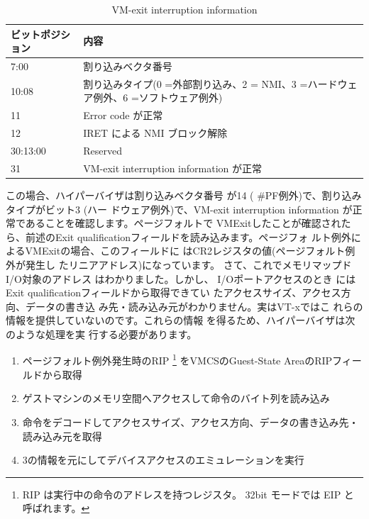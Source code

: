 \begin{table}\centering
\begin{tabular}{|p{4.5cm}|p{10cm}|} \hline

ビットポジション & 内容 \\
\hline
7:00 & 割り込みベクタ番号 \\
\hline
10:08 & 割り込みタイプ(0 =外部割り込み、2 = NMI、3 =ハードウェア例外、6 =ソフトウェア例外) \\
\hline
11 & Error code が正常 \\
\hline
12 & IRET による NMI ブロック解除 \\
\hline
30:13:00 & Reserved \\
\hline
31 & VM-exit interruption information が正常 \\
\hline



\end{tabular}
\caption{VM-exit interruption information}
\label{tab2}
\end{table}

 この場合、ハイパーバイザは割り込みベクタ番号
が14 ( \#PF例外)で、割り込みタイプがビット3 (ハー
ドウェア例外)で、VM-exit interruption information
が正常であることを確認します。ページフォルトで
VMExitしたことが確認されたら、前述のExit
qualificationフィールドを読み込みます。ページフォ
ルト例外によるVMExitの場合、このフィールドに
はCR2レジスタの値(ページフォルト例外が発生し
たリニアアドレス)になっています。
 さて、これでメモリマップドI/O対象のアドレス
はわかりました。しかし、 I/Oポートアクセスのとき
にはExit qualificationフィールドから取得できてい
たアクセスサイズ、アクセス方向、データの書き込
み先・読み込み元がわかりません。実はVT-xではこ
れらの情報を提供していないのです。これらの情報
を得るため、ハイパーバイザは次のような処理を実
行する必要があります。

\begin{enumerate}

\item{ページフォルト例外発生時のRIP
  \footnote{
  RIP は実行中の命令のアドレスを持つレジスタ。 32bit モードでは EIP と呼ばれます。
  }
をVMCSのGuest-State AreaのRIPフィールドから取得}
\item{ゲストマシンのメモリ空間へアクセスして命令のバイト列を読み込み}
\item{命令をデコードしてアクセスサイズ、アクセス方向、データの書き込み先・読み込み元を取得}
\item{3の情報を元にしてデバイスアクセスのエミュレーションを実行}
\end{enumerate}

